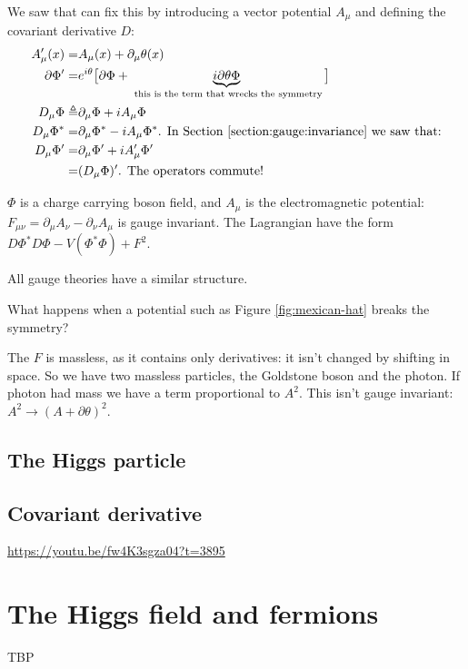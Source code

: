 \documentclass[]{article}
\begin{document}
We saw that can fix this by introducing a vector potential $A_\mu$ and defining the covariant derivative $D$:
\begin{align*}
	A^\prime_\mu(x) =& A_\mu(x) + \partial_\mu \theta(x)\\
	\partial \Phi^\prime =& e^{i\theta} \big[\partial \Phi + \underbrace{i \partial \theta \Phi}_\text{ this is the term that wrecks the symmetry}\big] \\
	D_\mu \Phi \triangleq& \partial_\mu \Phi + i A_\mu \Phi\\
	D_\mu \Phi^* =& \partial_\mu \Phi^* - i A_\mu \Phi^* \text{. In Section \ref{section:gauge:invariance} we saw that:}\\
	D_\mu \Phi^\prime =& \partial_\mu \Phi^\prime + i A^\prime_\mu \Phi^\prime \\
	=& (D_\mu \Phi)^\prime \text{. The operators commute!}
\end{align*}

$\Phi$ is a charge carrying boson field, and $A_\mu$ is the electromagnetic potential: $F_{\mu\nu}=\partial_\mu A_\nu-\partial_\nu A_\mu$ is gauge invariant. The Lagrangian have the form $D\Phi^* D\Phi -V(\Phi^*\Phi) +F^2$. 

All gauge theories have a similar structure.

What happens when a potential such as Figure \ref{fig:mexican-hat} breaks the symmetry?

The $F$ is massless, as it contains only derivatives: it isn't changed by shifting in space. So we have two massless particles, the Goldstone boson and the photon. If photon had mass we have a term proportional to $A^2$. This isn't gauge invariant: $A^2 \rightarrow (A+\partial \theta)^2$.

\subsection{The Higgs particle}

\subsection{Covariant derivative}

\url{https://youtu.be/fw4K3sgza04?t=3895}

\section{The Higgs field and fermions}

TBP
\end{document}
